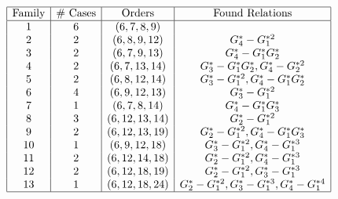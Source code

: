 \begin{table}[h]
	\centering
	$\begin{array}{|c|c|c|c|}
		\hline
		\text{Family} & \text{\# Cases} & \text{Orders} & \text{Found Relations} \\
		\hline
		1 & 6 & (6, 7, 8, 9) &  \\
		2 & 2 & (6, 8, 9, 12) & G_4^* - G_1^{ *2} \\
		3 & 2 & (6, 7, 9, 13) & G_4^* - G_1^{ *}G_2^{ *} \\
		4 & 2 & (6, 7, 13, 14) & G_3^* - G_1^{ *}G_2^{ *}, G_4^* - G_2^{ *2} \\
		5 & 2 & (6, 8, 12, 14) & G_3^* - G_1^{ *2}, G_4^* - G_1^{ *}G_2^{ *} \\
		6 & 4 & (6, 9, 12, 13) & G_3^* - G_1^{ *2} \\
		7 & 1 & (6, 7, 8, 14) & G_4^* - G_1^{ *}G_3^{ *} \\
		8 & 3 & (6, 12, 13, 14) & G_2^* - G_1^{ *2} \\
		9 & 2 & (6, 12, 13, 19) & G_2^* - G_1^{ *2}, G_4^* - G_1^{ *}G_3^{ *} \\
		10 & 1 & (6, 9, 12, 18) & G_3^* - G_1^{ *2}, G_4^* - G_1^{ *3} \\
		11 & 2 & (6, 12, 14, 18) & G_2^* - G_1^{ *2}, G_4^* - G_1^{ *3} \\
		12 & 2 & (6, 12, 18, 19) & G_2^* - G_1^{ *2}, G_3^* - G_1^{ *3} \\
		13 & 1 & (6, 12, 18, 24) & G_2^* - G_1^{ *2}, G_3^* - G_1^{ *3}, G_4^* - G_1^{ *4} \\
		\hline
	\end{array}$
\end{table}
